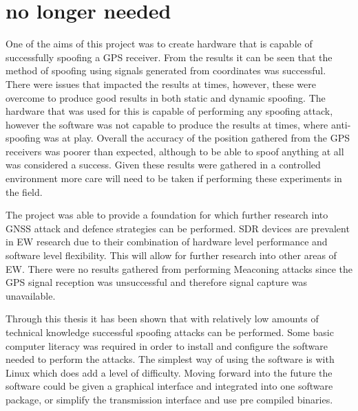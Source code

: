 
\chapter{no longer needed} %

\label{Chapter7} %

One of the aims of this project was to create hardware that is capable of successfully spoofing a GPS receiver. From the results it can be seen that the method of
spoofing using signals generated from coordinates was successful. There were issues that impacted the results at times, however, these were overcome to produce good
results in both static and dynamic spoofing. The hardware that was used for this is capable of performing any spoofing attack, however the
software was not capable to produce the results at times, where anti-spoofing was at play.
Overall the accuracy of the position gathered from the GPS receivers was poorer than expected, although
to be able to spoof anything at all was considered a success. Given these results were gathered in a controlled environment more care will need to be taken if
performing these experiments in the field. 

\bigskip

The project was able to provide a foundation for which further research into GNSS attack and defence strategies can be
performed. SDR devices are prevalent in EW research due to their combination of hardware level performance and software level flexibility. This will allow for further
research into other areas of EW.
There were no results gathered from performing Meaconing attacks since the GPS signal reception was unsuccessful and therefore signal capture was unavailable.

Through this thesis it has been shown that with relatively low amounts of technical knowledge successful spoofing attacks can be performed. Some basic computer literacy
was required in order to install and configure the software needed to perform the attacks. The simplest way of using the software is with Linux which does add a level of
difficulty.
Moving forward into the future the software could be given a graphical interface and integrated into one software package, or simplify the transmission interface and use
pre compiled binaries.